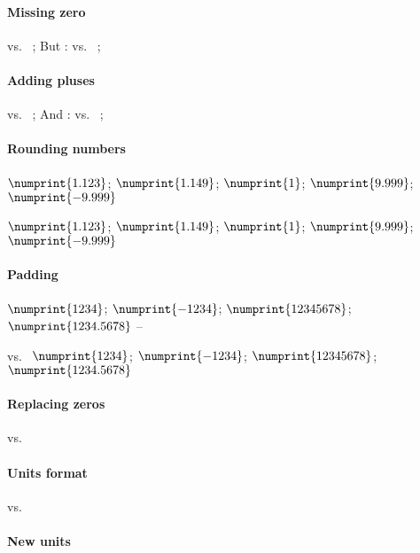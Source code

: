 \documentclass{article}
\begin{document}
\paragraph{Missing zero}
{\npnoaddmissingzero{}} vs.~ {\npaddmissingzero{}};
But : {\npnoaddmissingzero{}} vs.~ {\npaddmissingzero{}};

\paragraph{Adding pluses}
 vs.~ {\npaddplus{}};
And :  vs.~ {\npaddplusexponent{}};

\paragraph{Rounding numbers}
{\npnoround
 $\numprint{1.123}$; $\numprint{1.149}$;
 $\numprint{1}$; $\numprint{9.999}$; $\numprint{-9.999}$}

{
 $\numprint{1.123}$; $\numprint{1.149}$;
 $\numprint{1}$; $\numprint{9.999}$; $\numprint{-9.999}$ }

\paragraph{Padding}
{%
 $\numprint{1234}$; $\numprint{-1234}$;
 $\numprint{12345678}$; $\numprint{1234.5678}$ --}

vs.~{%
 $\numprint{1234}$; $\numprint{-1234}$;
 $\numprint{12345678}$; $\numprint{1234.5678}$}

\paragraph{Replacing zeros}
  vs.~{\npreplacenull{\mbox{---}} }

\paragraph{Units format}
vs. {\renewcommand*\npunitcommand[1]{\ensuremath{\color{blue}\mathrm{#1}}}
 }

\paragraph{New units}
\end{document}
